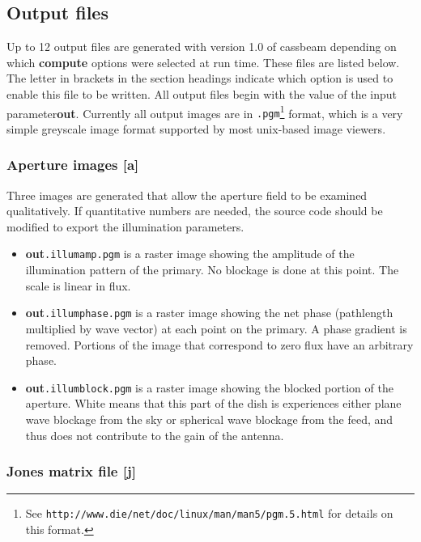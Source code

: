 \documentclass{article}
\begin{document}
\subsection{Output files} \label{sec:output}

Up to 12 output files are generated with version 1.0 of cassbeam depending
on which {\bf compute} options were selected at run time.  These files are
listed below.  The letter in brackets in the section headings indicate which
option is used to enable this file to be written.  All output files begin
with the value of the input parameter{\bf out}.  Currently all output images
are in {\tt .pgm}\footnote{See 
{\tt http://www.die/net/doc/linux/man/man5/pgm.5.html} 
for details on this format.} format, which is a very simple greyscale 
image format supported by most unix-based image viewers.  

\subsubsection{Aperture images [{\bf a}]}

Three images are generated that allow the aperture field to be examined
qualitatively.
If quantitative numbers are needed, the source code should be modified to
export the illumination parameters.
\begin{itemize}
\item {\bf out}{\tt .illumamp.pgm} is a raster image showing the amplitude
of the illumination pattern of the primary.  No blockage is done at this
point.  The scale is linear in flux.
\item {\bf out}{\tt .illumphase.pgm} is a raster image showing the
net phase (pathlength multiplied by wave vector) at each point on the
primary.  A phase gradient is removed.  Portions of the image that correspond
to zero flux have an arbitrary phase.
\item {\bf out}{\tt .illumblock.pgm} is a raster image showing the
blocked portion of the aperture.  White means that this part of the dish is 
experiences either plane wave blockage from the
sky or spherical wave blockage from the feed, and thus does not contribute
to the gain of the antenna.
\end{itemize}

\subsubsection{Jones matrix file [{\bf j}]}
\end{document}
